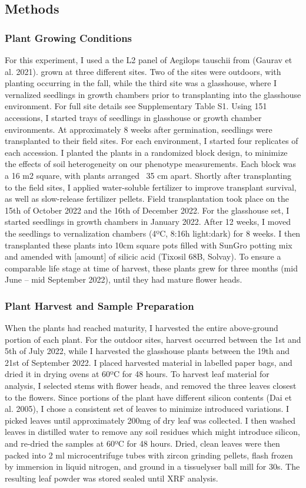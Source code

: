 \documentclass[12pt, letterpaper, ]{article}
\begin{document}
\subsection{Methods}
\subsubsection{Plant Growing Conditions}
For this experiment, I used a the L2 panel of Aegilops tauschii from (Gaurav et al. 2021). grown at three different sites. Two of the sites were outdoors, with planting occurring in the fall, while the third site was a glasshouse, where I vernalized seedlings in growth chambers prior to transplanting into the glasshouse environment. For full site details see Supplementary Table S1. Using 151 accessions, I started trays of seedlings in glasshouse or growth chamber environments. At approximately 8 weeks after germination, seedlings were transplanted to their field sites. For each environment, I started four replicates of each accession. I planted the plants in a randomized block design, to minimize the effects of soil heterogeneity on our phenotype measurements. Each block was a 16 m2 square, with plants arranged ~35 cm apart. Shortly after transplanting to the field sites, I applied water-soluble fertilizer to improve transplant survival, as well as slow-release fertilizer pellets. Field transplantation took place on the 15th of October 2022 and the 16th of December 2022. For the glasshouse set, I started seedlings in growth chambers in January 2022. After 12 weeks, I moved the seedlings to vernalization chambers (4ºC, 8:16h light:dark) for 8 weeks. I then transplanted these plants into 10cm square pots filled with SunGro potting mix and amended with [amount] of silicic acid (Tixosil 68B, Solvay). To ensure a comparable life stage at time of harvest, these plants grew for three months (mid June – mid September 2022), until they had mature flower heads. 
\subsubsection{Plant Harvest and Sample Preparation}
When the plants had reached maturity, I harvested the entire above-ground portion of each plant. For the outdoor sites, harvest occurred between the 1st and 5th of July 2022, while I harvested the glasshouse plants between the 19th and 21st of September 2022. I placed harvested material in labelled paper bags, and dried it in drying ovens at 60ºC for 48 hours. To harvest leaf material for analysis, I selected stems with flower heads, and removed the three leaves closest to the flowers. Since portions of the plant have different silicon contents (Dai et al. 2005), I chose a consistent set of leaves to minimize introduced variations. I picked leaves until approximately 200mg of dry leaf was collected. I then washed leaves in distilled water to remove any soil residues which might introduce silicon, and re-dried the samples at 60ºC for 48 hours. Dried, clean leaves were then packed into 2 ml microcentrifuge tubes with zircon grinding pellets, flash frozen by immersion in liquid nitrogen, and ground in a tissuelyser ball mill for 30s. The resulting leaf powder was stored sealed until XRF analysis. 
\end{document}
